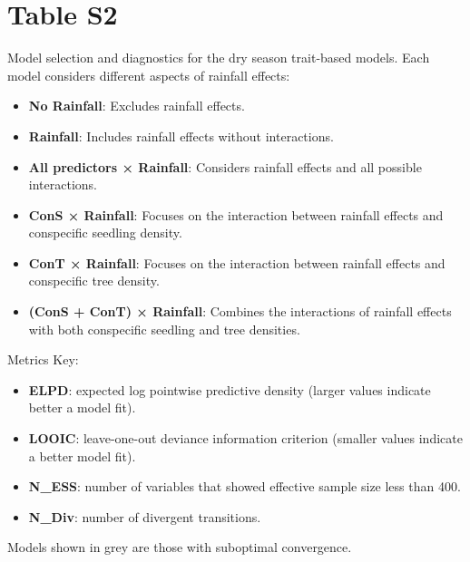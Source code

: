 \documentclass[
  12pt,
  letterpaper,
  DIV=11,
  numbers=noendperiod]{scrartcl}
\providecommand{\tightlist}{%
  \setlength{\itemsep}{0pt}\setlength{\parskip}{0pt}}\usepackage{longtable,booktabs,array}
\begin{document}
\newpage

\hypertarget{table-s2}{%
\section{Table S2}\label{table-s2}}

Model selection and diagnostics for the dry season trait-based models.
Each model considers different aspects of rainfall effects:

\begin{itemize}
\tightlist
\item
  \textbf{No Rainfall}: Excludes rainfall effects.
\item
  \textbf{Rainfall}: Includes rainfall effects without interactions.
\item
  \textbf{All predictors × Rainfall}: Considers rainfall effects and all
  possible interactions.
\item
  \textbf{ConS × Rainfall}: Focuses on the interaction between rainfall
  effects and conspecific seedling density.
\item
  \textbf{ConT × Rainfall}: Focuses on the interaction between rainfall
  effects and conspecific tree density.
\item
  \textbf{(ConS + ConT) × Rainfall}: Combines the interactions of
  rainfall effects with both conspecific seedling and tree densities.
\end{itemize}

Metrics Key:

\begin{itemize}
\tightlist
\item
  \textbf{ELPD}: expected log pointwise predictive density (larger
  values indicate better a model fit).
\item
  \textbf{LOOIC}: leave-one-out deviance information criterion (smaller
  values indicate a better model fit).
\item
  \textbf{N\_ESS}: number of variables that showed effective sample size
  less than 400.
\item
  \textbf{N\_Div}: number of divergent transitions.
\end{itemize}

Models shown in grey are those with suboptimal convergence.
\end{document}
